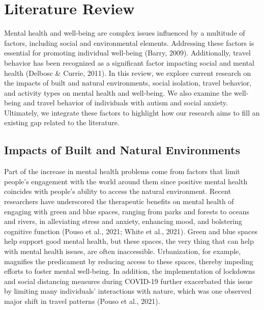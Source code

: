 \documentclass[
  letterpaper,
  number,
  review,
  3p]{elsarticle}
\begin{document}

\section{Literature Review}\label{literature-review}

Mental health and well-being are complex issues influenced by a
multitude of factors, including social and environmental elements.
Addressing these factors is essential for promoting individual
well-being (Barry, 2009). Additionally, travel behavior has been
recognized as a significant factor impacting social and mental health
(Delbosc \& Currie, 2011). In this review, we explore current research
on the impacts of built and natural environments, social isolation,
travel behavior, and activity types on mental health and well-being. We
also examine the well-being and travel behavior of individuals with
autism and social anxiety. Ultimately, we integrate these factors to
highlight how our research aims to fill an existing gap related to the
literature.

\subsection{Impacts of Built and Natural
Environments}\label{impacts-of-built-and-natural-environments}

Part of the increase in mental health problems come from factors that
limit people's engagement with the world around them since positive
mental health coincides with people's ability to access the natural
environment. Recent researchers have underscored the therapeutic
benefits on mental health of engaging with green and blue spaces,
ranging from parks and forests to oceans and rivers, in alleviating
stress and anxiety, enhancing mood, and bolstering cognitive function
(Pouso et al., 2021; White et al., 2021). Green and blue spaces help
support good mental health, but these spaces, the very thing that can
help with mental health issues, are often inaccessible. Urbanization,
for example, magnifies the predicament by reducing access to these
spaces, thereby impeding efforts to foster mental well-being. In
addition, the implementation of lockdowns and social distancing measures
during COVID-19 further exacerbated this issue by limiting many
individuals' interactions with nature, which was one observed major
shift in travel patterns (Pouso et al., 2021).
\end{document}
